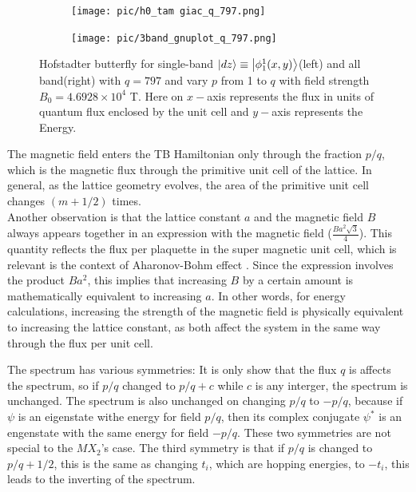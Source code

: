 \documentclass{report}
\begin{document}
\begin{figure}[htb]
	\centering
	\begin{subfigure}[b]{0.495\textwidth}
		\centering
		\texttt{[image: pic/h0\_tam giac\_q\_797.png]}
		\label{fig:3 band}
	\end{subfigure}
	\begin{subfigure}[b]{0.495\textwidth}
		\centering
		\texttt{[image: pic/3band\_gnuplot\_q\_797.png]}
		\label{fig:1 band}
	\end{subfigure}
	\caption{
		Hofstadter butterfly for single-band $\ket{dz} \equiv \ket{\phi_{1}^{1}(x,y)}$(left) and all band(right) with $q = 797$ and vary $p$  from 1 to $q$ with field strength $B_{0} = 4.6928 \times 10^{4}$ T. Here on $x-$axis represents the flux in units of quantum flux enclosed by the unit cell and $y-$axis represents the Energy.
	}
\end{figure}

The magnetic field enters the TB Hamiltonian only through the fraction $p/q$, which is the magnetic flux through the primitive unit cell of the lattice. In general, as the lattice geometry evolves, the area of the primitive unit cell changes $(m + 1/2)$ times. \\
Another observation is that the lattice constant $a$ and the magnetic field $B$ always appears together in an expression with the magnetic field ($\tfrac{Ba^{2}\sqrt{3}}{4}$). This quantity reflects the flux per plaquette in the super magnetic unit cell, which is relevant is the context of Aharonov-Bohm effect \cite{aharonov1959}. Since the expression involves the product $Ba^{2}$, this implies that increasing $B$ by a certain amount is mathematically equivalent to increasing $a$. In other words, for energy calculations, increasing the strength of the magnetic field is physically equivalent to increasing the lattice constant, as both affect the system in the same way through the flux per unit cell.

The spectrum has various symmetries: It is only show that the flux $q$ is affects the spectrum, so if $p/q$ changed to $p/q + c$ while $c$ is any interger, the spectrum is unchanged. The spectrum is also unchanged on changing $p/q$ to $-p/q$, because if $\psi$ is an eigenstate withe energy for field $p/q$, then its complex conjugate $\psi^{*}$ is an engenstate with the same energy for field $-p/q$. These two symmetries are not special to the $MX_{2}$'s case. The third symmetry is that if $p/q$ is changed to $p/q + 1/2$, this is the same as changing $t_{i}$, which are hopping energies, to $-t_{i}$, this leads to the inverting of the spectrum.
\end{document}
